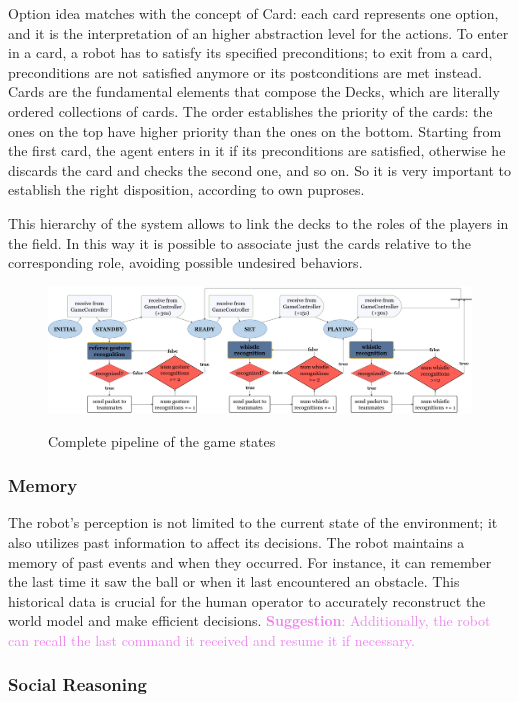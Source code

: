\documentclass[a4paper, onecolumn, 12pt]{article}
\newcommand\suggestion[1]{\textcolor{violet}{\textbf{Suggestion}: #1}}
\begin{document}
Option idea matches with the concept of Card: each card represents one option, and it is the interpretation
of an higher abstraction level for the actions. 
To enter in a card, a robot has to satisfy its specified preconditions; to exit from a card, preconditions are not
satisfied anymore or its postconditions are met instead.
Cards are the fundamental elements that compose the Decks, which are literally ordered collections of cards.
The order establishes the priority of the cards: the ones on the top have higher priority than the ones on the bottom.
Starting from the first card, the agent enters in it if its preconditions are satisfied, otherwise he discards 
the card and checks the second one, and so on. So it is very important to establish the right disposition,
according to own puproses. 

This hierarchy of the system allows to link the decks to the roles of the players in the field. 
In this way it is possible to associate just the cards relative to the corresponding role, avoiding
possible undesired behaviors. 


\begin{figure}
    \centering
    \includegraphics[width=0.9\linewidth]{assets/flowchart.png}
    \label{fig:flowchart}
    \caption{Complete pipeline of the game states}
\end{figure}

\subsubsection{Memory}
The robot's perception is not limited to the current state of the environment; 
it also utilizes past information to affect its decisions. The robot maintains 
a memory of past events and when they occurred. For instance, it can remember the 
last time it saw the ball or when it last encountered an obstacle. This historical 
data is crucial for the human operator to accurately reconstruct the world model 
and make efficient decisions. \suggestion{Additionally, the robot can recall the last command 
it received and resume it if necessary.}

\subsubsection{Social Reasoning}
\end{document}
